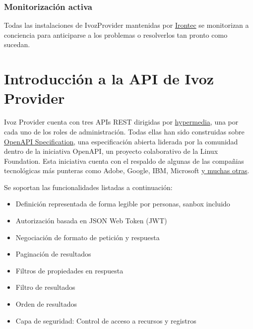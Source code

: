 \documentclass[letterpaper,10pt,spanish]{sphinxmanual}
\begin{document}
\subsection{Monitorización activa}
\label{security_and_maintenance/maintenance/other_tools:active-monitoring}
Todas las instalaciones de IvozProvider mantenidas por \href{https://www.irontec.com}{Irontec} se monitorizan a conciencia para anticiparse a los problemas o resolverlos tan pronto como sucedan.


\chapter{Introducción a la API de Ivoz Provider}
\label{api_rest/introduction:introduction-to-ivozprovider-api}\label{api_rest/introduction::doc}
Ivoz Provider cuenta con tres APIs REST dirigidas por \href{https://en.wikipedia.org/wiki/HATEOAS}{hypermedia}, una por cada uno de los roles de administración. Todas ellas han sido construidas sobre \href{https://www.openapis.org/}{OpenAPI Specification}, una especificación abierta liderada por la comunidad dentro de la iniciativa OpenAPI, un proyecto colaborativo de la Linux Foundation. Esta iniciativa cuenta con el respaldo de algunas de las compañias tecnológicas más punteras como Adobe, Google, IBM, Microsoft \href{https://www.openapis.org/membership/members)}{y muchas otras}.

Se soportan las funcionalidades listadas a continuación:
\begin{itemize}
\item {} 
Definición representada de forma legible por personas, sanbox incluido

\item {} 
Autorización basada en JSON Web Token (JWT)

\item {} 
Negociación de formato de petición y respuesta

\item {} 
Paginación de resultados

\item {} 
Filtros de propiedades en respuesta

\item {} 
Filtro de resultados

\item {} 
Orden de resultados

\item {} 
Capa de seguridad: Control de acceso a recursos y registros

\end{itemize}
\end{document}
